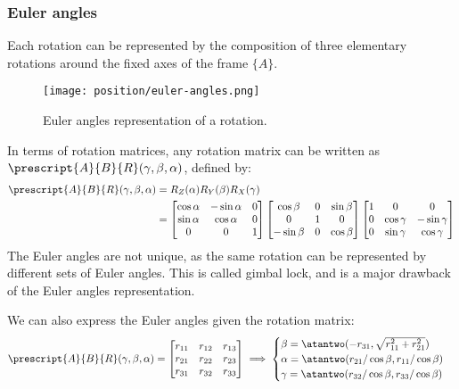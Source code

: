 \subsubsection{Euler angles}
Each rotation can be represented by the composition of three elementary rotations around the fixed axes of the frame $\{A\}$.
\begin{figure}[H]
    \centering
    \texttt{[image: position/euler-angles.png]}
    \caption{Euler angles representation of a rotation.}
\end{figure}
In terms of rotation matrices, any rotation matrix can be written as $\prescript{A}{B}{R}(\gamma, \beta, \alpha)$, defined by:
\begin{align*}
    \prescript{A}{B}{R}(\gamma, \beta, \alpha) &= R_Z(\alpha)R_Y(\beta)R_X(\gamma)\\
    &= \begin{bmatrix}
        \cos\alpha & -\sin\alpha & 0 \\
        \sin\alpha & \cos\alpha & 0 \\
        0 & 0 & 1
    \end{bmatrix}
    \begin{bmatrix}
        \cos\beta & 0 & \sin\beta \\
        0 & 1 & 0 \\
        -\sin\beta & 0 & \cos\beta
    \end{bmatrix}
    \begin{bmatrix}
        1 & 0 & 0 \\
        0 & \cos\gamma & -\sin\gamma \\
        0 & \sin\gamma & \cos\gamma
    \end{bmatrix}
\end{align*}
The Euler angles are not unique, as the same rotation can be represented by different sets of Euler angles. This is called gimbal lock, and is a major drawback of the Euler angles representation.

We can also express the Euler angles given the rotation matrix:
\begin{align*}
    \prescript{A}{B}{R}(\gamma, \beta, \alpha) = \begin{bmatrix}
        r_{11} & r_{12} & r_{13} \\
        r_{21} & r_{22} & r_{23} \\
        r_{31} & r_{32} & r_{33}
    \end{bmatrix}
    \implies
    \begin{cases}
        \beta = \atantwo(-r_{31}, \sqrt{r_{11}^2+r_{21}^2}) \\
        \alpha = \atantwo(r_{21}/\cos\beta, r_{11}/\cos\beta) \\
        \gamma = \atantwo(r_{32}/\cos\beta, r_{33}/\cos\beta)
    \end{cases}
\end{align*}

